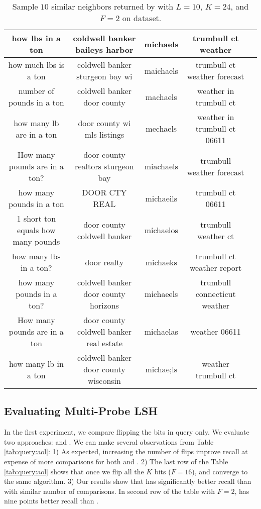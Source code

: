 \begin{table*}[t]
\centering
\footnotesize \addtolength{\tabcolsep}{-0.5pt} \addtolength{\tabcolsep}{-0.6pt}
{

\begin{tabular}{|c!{\vrule width 1.3pt}c!{\vrule width 1.3pt}c!{\vrule width 1.3pt}c!{\vrule width 1.3pt}c|}
\hline
\textbf{how lbs in a ton}&\textbf{coldwell banker baileys harbor }&\textbf{michaels} &\textbf{trumbull ct weather} \\ %
\hline
how much lbs is a ton & coldwell banker sturgeon bay wi & maichaels & trumbull ct weather forecast \\
number of pounds in a ton & coldwell banker door county & machaels & weather in trumbull ct  \\
how many lb are in a ton & door county wi mls listings & mechaels   & weather in trumbull ct 06611 \\
How many pounds are in a ton? & door county realtors sturgeon bay & miachaels & trumbull weather forecast \\
how many pounds in a ton & DOOR CTY REAL & michaeils & trumbull ct 06611 \\
1 short ton equals how many pounds & door county coldwell banker & michaelos & trumbull weather ct \\   
how many lbs in a ton? & door realty & michaeks & trumbull ct weather report \\
how many pounds in a ton? & coldwell banker door county horizons & michaeels & trumbull connecticut weather \\ 
How many pounds are in a ton & door county coldwell banker real estate & michaelas & weather 06611  \\
how many lb in a ton & coldwell banker door county wisconsin & michae;ls  & weather trumbull ct  \\
\hline
\end{tabular}
\caption{\footnotesize{Sample $10$ similar neighbors returned by \dflipb with $L=10$, $K=24$, and $F=2$ on \dataC dataset.}}
\label{tab:lists}
}
\end{table*}


\subsection{Evaluating Multi-Probe LSH}
\label{subsec:eval:multiProbeLSH}
In the first experiment, we compare flipping the bits in query only. 
We evaluate two approaches: \rflipq and \dflipq. We can make several observations from Table \ref{tab:query:aol}: 1) As expected, increasing the number of flips improve recall at expense of more comparisons for both \dflipq and \rflipq. 2) The last row of the Table \ref{tab:query:aol} shows that once we flip all the $K$ bits ($F=16$),  \dflipq and \rflipq converge to the same algorithm.  3) Our results show that \dflipq has significantly better recall than \rflipq with similar number of comparisons. In second row of the table with $F=2$, \dflipq has nine points better recall than \rflipq.  

